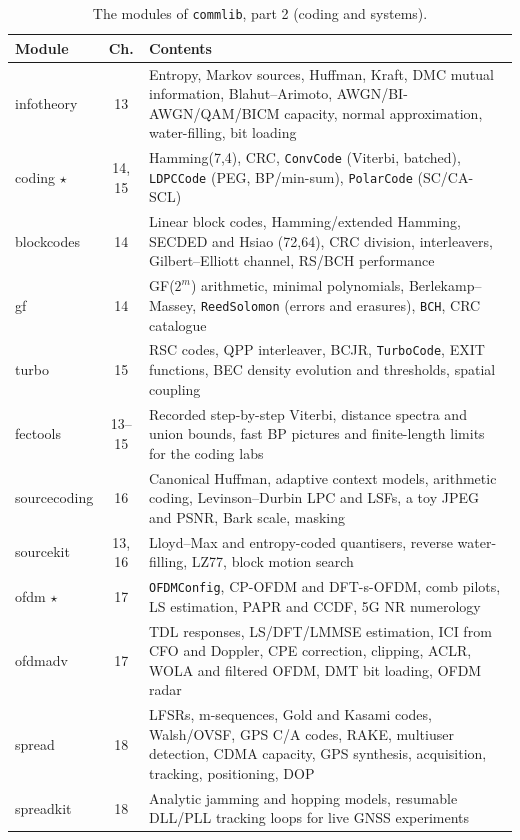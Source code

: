\begin{table}[htbp]\centering\footnotesize
\caption{The modules of \texttt{commlib}, part 2 (coding and systems).}\label{tab:appB:modules2}
\renewcommand{\arraystretch}{1.0}
\begin{tabularx}{\linewidth}{@{}>{\ttfamily}lc>{\raggedright\arraybackslash}X@{}}
\toprule
\normalfont Module & Ch. & Contents\\
\midrule
infotheory & 13 & Entropy, Markov sources, Huffman, Kraft, DMC mutual information, Blahut--Arimoto, AWGN/BI-AWGN/QAM/BICM capacity, normal approximation, water-filling, bit loading\\
coding $\star$ & 14, 15 & Hamming(7,4), CRC, \texttt{ConvCode} (Viterbi, batched), \texttt{LDPCCode} (PEG, BP/min-sum), \texttt{PolarCode} (SC/CA-SCL)\\
blockcodes & 14 & Linear block codes, Hamming/extended Hamming, SECDED and Hsiao (72,64), CRC division, interleavers, Gilbert--Elliott channel, RS/BCH performance\\
gf & 14 & GF($2^m$) arithmetic, minimal polynomials, Berlekamp--Massey, \texttt{ReedSolomon} (errors and erasures), \texttt{BCH}, CRC catalogue\\
turbo & 15 & RSC codes, QPP interleaver, BCJR, \texttt{TurboCode}, EXIT functions, BEC density evolution and thresholds, spatial coupling\\
fectools & 13--15 & Recorded step-by-step Viterbi, distance spectra and union bounds, fast BP pictures and finite-length limits for the coding labs\\
sourcecoding & 16 & Canonical Huffman, adaptive context models, arithmetic coding, Levinson--Durbin LPC and LSFs, a toy JPEG and PSNR, Bark scale, masking\\
sourcekit & 13, 16 & Lloyd--Max and entropy-coded quantisers, reverse water-filling, LZ77, block motion search\\
ofdm $\star$ & 17 & \texttt{OFDMConfig}, CP-OFDM and DFT-s-OFDM, comb pilots, LS estimation, PAPR and CCDF, 5G NR numerology\\
ofdmadv & 17 & TDL responses, LS/DFT/LMMSE estimation, ICI from CFO and Doppler, CPE correction, clipping, ACLR, WOLA and filtered OFDM, DMT bit loading, OFDM radar\\
spread & 18 & LFSRs, m-sequences, Gold and Kasami codes, Walsh/OVSF, GPS C/A codes, RAKE, multiuser detection, CDMA capacity, GPS synthesis, acquisition, tracking, positioning, DOP\\
spreadkit & 18 & Analytic jamming and hopping models, resumable DLL/PLL tracking loops for live GNSS experiments\\

\end{tabularx}
\end{table}
